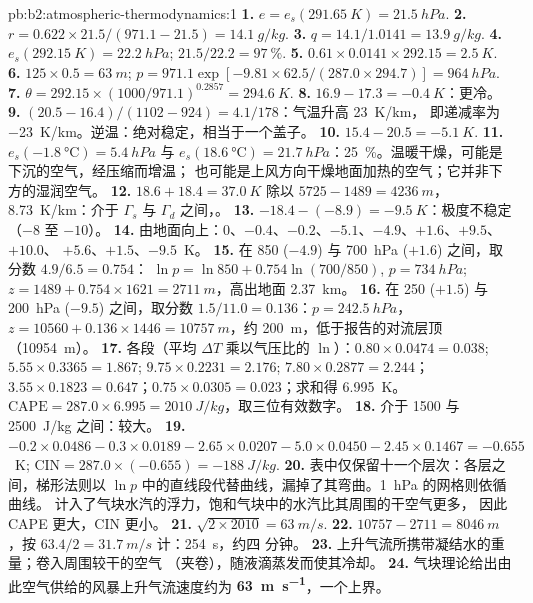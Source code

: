 \begin{solution}{pb:b2:atmospheric-thermodynamics:1}
\textbf{1.} $e = e_s(\qty{291.65}{K}) = \qty{21.5}{hPa}$.
\textbf{2.} $r = 0.622 \times 21.5/(971.1 - 21.5) = \qty{14.1}{g/kg}$.
\textbf{3.} $q = 14.1/1.0141 = \qty{13.9}{g/kg}$.
\textbf{4.} $e_s(\qty{292.15}{K}) = \qty{22.2}{hPa}$; $21.5/22.2 = \qty{97}{\percent}$.
\textbf{5.} $0.61 \times 0.0141 \times 292.15 = \qty{2.5}{K}$.
\textbf{6.} $125 \times 0.5 = \qty{63}{m}$; $p = 971.1 \exp[-9.81 \times 62.5/(287.0 \times 294.7)]
= \qty{964}{hPa}$.
\textbf{7.} $\theta = 292.15 \times (1000/971.1)^{0.2857} = \qty{294.6}{K}$.
\textbf{8.} $16.9 - 17.3 = \qty{-0.4}{K}$：更冷。
\textbf{9.} $(20.5 - 16.4)/(1102 - 924) = 4.1/178$：气温升高 \qty{23}{K/km}，
即递减率为 \qty{-23}{K/km}。逆温：绝对稳定，相当于一个盖子。
\textbf{10.} $15.4 - 20.5 = \qty{-5.1}{K}$.
\textbf{11.} $e_s(\qty{-1.8}{\celsius}) = \qty{5.4}{hPa}$ 与 $e_s(\qty{18.6}{\celsius}) =
\qty{21.7}{hPa}$：\qty{25}{\percent}。温暖干燥，可能是下沉的空气，经压缩而增温；
也可能是上风方向干燥地面加热的空气；它并非下方的湿润空气。
\textbf{12.} $18.6 + 18.4 = \qty{37.0}{K}$ 除以 $5725 - 1489 = \qty{4236}{m}$，\qty{8.73}{K/km}：介于 $\Gamma_s$ 与
$\Gamma_d$ 之间，。
\textbf{13.} $-18.4 - (-8.9) = \qty{-9.5}{K}$：极度不稳定（$-8$ 至 $-10$）。
\textbf{14.} 由地面向上：0、$-0.4$、$-0.2$、$-5.1$、$-4.9$、$+1.6$、$+9.5$、$+10.0$、
$+5.6$、$+1.5$、$-9.5$~\unit{K}。
\textbf{15.} 在 850 ($-4.9$) 与 \qty{700}{hPa} ($+1.6$) 之间，取分数 $4.9/6.5 = 0.754$：
$\ln p = \ln 850 + 0.754 \ln(700/850)$, $p = \qty{734}{hPa}$; $z = 1489 + 0.754 \times 1621 =
\qty{2711}{m}$，高出地面 \qty{2.37}{km}。
\textbf{16.} 在 250 ($+1.5$) 与 \qty{200}{hPa} ($-9.5$) 之间，取分数 $1.5/11.0 =
0.136$：$p = \qty{242.5}{hPa}$，$z = 10560 + 0.136 \times 1446 = \qty{10757}{m}$，约
\qty{200}{m}，低于报告的对流层顶（\qty{10954}{m}）。
\textbf{17.} 各段（平均 $\Delta T$ 乘以气压比的 $\ln$）：$0.80 \times 0.0474
= 0.038$; $5.55 \times 0.3365 = 1.867$; $9.75 \times 0.2231 = 2.176$; $7.80 \times 0.2877 =
2.244$；$3.55 \times 0.1823 = 0.647$；$0.75 \times 0.0305 = 0.023$；求和得 \qty{6.995}{K}。
$\text{CAPE} = 287.0 \times 6.995 = \qty{2010}{J/kg}$，取三位有效数字。
\textbf{18.} 介于 1500 与 \qty{2500}{J/kg} 之间：较大。
\textbf{19.} $-0.2 \times 0.0486 - 0.3 \times 0.0189 - 2.65 \times 0.0207 - 5.0 \times 0.0450 -
2.45 \times 0.1467 = -0.655$~\unit{K}; $\text{CIN} = 287.0 \times (-0.655) = \qty{-188}{J/kg}$.
\textbf{20.} 表中仅保留十一个层次：各层之间，梯形法则以
$\ln p$ 中的直线段代替曲线，漏掉了其弯曲。\qty{1}{hPa} 的网格则依循曲线。
计入了气块水汽的浮力，饱和气块中的水汽比其周围的干空气更多，
因此 CAPE 更大，CIN 更小。
\textbf{21.} $\sqrt{2 \times 2010} = \qty{63}{m/s}$.
\textbf{22.} $10757 - 2711 = \qty{8046}{m}$，按 $63.4/2 = \qty{31.7}{m/s}$ 计：\qty{254}{s}，约四
分钟。
\textbf{23.} 上升气流所携带凝结水的重量；卷入周围较干的空气
（夹卷），随液滴蒸发而使其冷却。
\textbf{24.} 气块理论给出由此空气供给的风暴上升气流速度约为
\textbf{\qty[text-series-to-math=true]{63}{m.s^{-1}}}，一个上界。
\end{solution}
